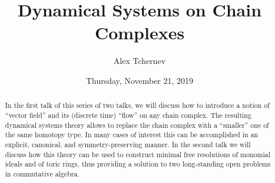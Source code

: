 \documentclass{UAmathtalk}
\author{Alex Tchernev}
\title{Dynamical Systems on Chain Complexes}
\date{Thursday, November 21, 2019}
\begin{document}
\maketitle

\begin{abstract}
In the first talk of this series of two talks, we will discuss how to introduce
a notion of ``vector field'' and its (discrete time) ``flow'' on any chain complex.
The resulting dynamical systems theory allows to replace the chain complex
with a ``smaller'' one of the same homotopy type. In many cases of interest
this can be accomplished in an explicit, canonical, and symmetry-preserving
manner. In the second talk we will discuss how this theory can be used
to construct minimal free resolutions of monomial ideals and of toric rings, thus
providing a solution to two long-standing open problems in commutative
algebra.
\end{abstract}
\end{document}
